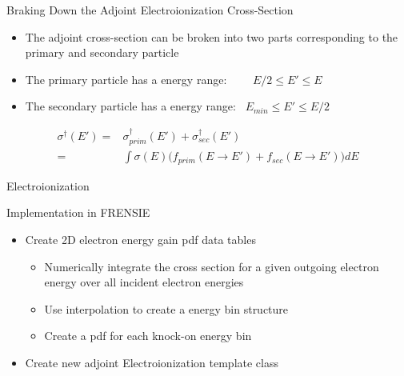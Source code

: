 \documentclass{beamer}
\begin{document}
\begin{frame}{Braking Down the Adjoint Electroionization Cross-Section}
	\begin{itemize}
	\item The adjoint cross-section can be broken into two parts corresponding to the primary and secondary particle
	\item The primary particle has a energy range: ~~~~$E/2 \leq E' \leq E$
	\item The secondary particle has a energy range: ~$E_{min} \leq E' \leq E/2$
	\end{itemize}


\begin{align}
\sigma^{\dagger}(E') = &\sigma^{\dagger}_{prim}(E') + \sigma^{\dagger}_{sec}(E') \nonumber \\
= & \int\sigma(E) \Big( f_{prim}(E \rightarrow E') + f_{sec}(E \rightarrow E') \Big)dE
\end{align}

\end{frame}

\begin{frame}{Electroionization}

\begin{block}{Implementation in FRENSIE}
	\begin{itemize}
	\item Create 2D electron energy gain pdf data tables
		\begin{itemize}
		\item Numerically integrate the cross section for a given outgoing electron energy over all incident electron energies
		\item Use interpolation to create a energy bin structure
		\item Create a pdf for each knock-on energy bin
		\end{itemize}
	
	\item Create new adjoint Electroionization template class
	\end{itemize}
\end{block}

\end{frame}

\end{document}
